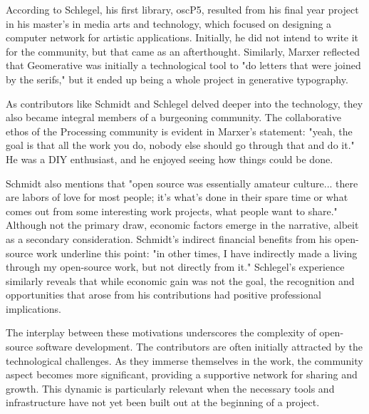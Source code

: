 According to Schlegel, his first library, oscP5, resulted from his final year project in his master's in media arts and technology, which focused on designing a computer network for artistic applications. Initially, he did not intend to write it for the community, but that came as an afterthought. Similarly, Marxer reflected that Geomerative was initially a technological tool to "do letters that were joined by the serifs," but it ended up being a whole project in generative typography.

As contributors like Schmidt and Schlegel delved deeper into the technology, they also became integral members of a burgeoning community. The collaborative ethos of the Processing community is evident in Marxer's statement: "yeah, the goal is that all the work you do, nobody else should go through that and do it." He was a DIY enthusiast, and he enjoyed seeing how things could be done. 

Schmidt also mentions that "open source was essentially amateur culture... there are labors of love for most people; it's what's done in their spare time or what comes out from some interesting work projects, what people want to share." Although not the primary draw, economic factors emerge in the narrative, albeit as a secondary consideration. Schmidt's indirect financial benefits from his open-source work underline this point: "in other times, I have indirectly made a living through my open-source work, but not directly from it." Schlegel's experience similarly reveals that while economic gain was not the goal, the recognition and opportunities that arose from his contributions had positive professional implications.

The interplay between these motivations underscores the complexity of open-source software development. The contributors are often initially attracted by the technological challenges. As they immerse themselves in the work, the community aspect becomes more significant, providing a supportive network for sharing and growth. This dynamic is particularly relevant when the necessary tools and infrastructure have not yet been built out at the beginning of a project.



